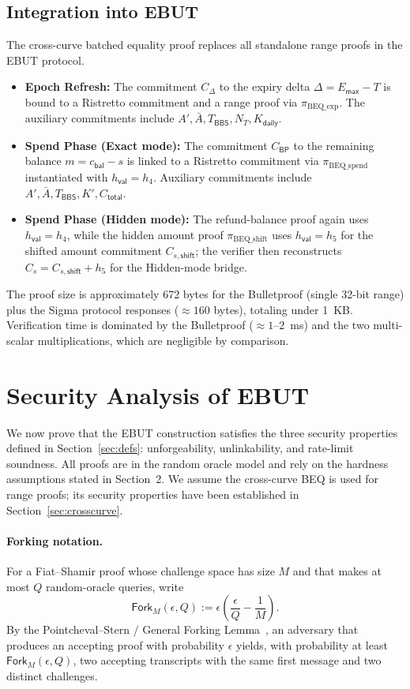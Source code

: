 \documentclass[11pt]{article}
\theoremstyle{definitionstyle}
\theoremstyle{plain}
\begin{document}
\subsection{Integration into EBUT}
The cross-curve batched equality proof replaces all standalone range proofs in the EBUT protocol.
\begin{itemize}
\item \textbf{Epoch Refresh:} The commitment $C_{\Delta}$ to the expiry delta $\Delta = E_{\mathsf{max}} - T$ is bound to a Ristretto commitment and a range proof via $\pi_{\text{BEQ\_exp}}$. The auxiliary commitments include $A', \bar{A}, T_{\mathsf{BBS}}, N_T, K_{\mathsf{daily}}$.
\item \textbf{Spend Phase (Exact mode):} The commitment $C_{\mathsf{BP}}$ to the remaining balance $m = c_{\mathsf{bal}} - s$ is linked to a Ristretto commitment via $\pi_{\text{BEQ\_spend}}$ instantiated with $h_{\mathsf{val}} = h_4$. Auxiliary commitments include $A', \bar{A}, T_{\mathsf{BBS}}, K', C_{\mathsf{total}}$.
\item \textbf{Spend Phase (Hidden mode):} The refund-balance proof again uses $h_{\mathsf{val}} = h_4$, while the hidden amount proof $\pi_{\text{BEQ\_shift}}$ uses $h_{\mathsf{val}} = h_5$ for the shifted amount commitment $C_{s,\mathsf{shift}}$; the verifier then reconstructs $C_s = C_{s,\mathsf{shift}} + h_5$ for the Hidden-mode bridge.
\end{itemize}
The proof size is approximately 672 bytes for the Bulletproof (single 32-bit range) plus the Sigma protocol responses ($\approx 160$ bytes), totaling under 1~KB. Verification time is dominated by the Bulletproof ($\approx 1$--$2$~ms) and the two multi-scalar multiplications, which are negligible by comparison.

\section{Security Analysis of EBUT}
\label{sec:security-ebut}

We now prove that the EBUT construction satisfies the three security properties defined in Section~\ref{sec:defs}: unforgeability, unlinkability, and rate-limit soundness. All proofs are in the random oracle model and rely on the hardness assumptions stated in Section~2. We assume the cross-curve BEQ is used for range proofs; its security properties have been established in Section~\ref{sec:crosscurve}.

\paragraph{Forking notation.}
For a Fiat--Shamir proof whose challenge space has size $M$ and that makes at most $Q$ random-oracle queries, write
\[
\mathsf{Fork}_M(\epsilon,Q) := \epsilon\!\left(\frac{\epsilon}{Q}-\frac{1}{M}\right).
\]
By the Pointcheval--Stern / General Forking Lemma~\cite{PointchevalStern00,BellareNeven06}, an adversary that produces an accepting proof with probability $\epsilon$ yields, with probability at least $\mathsf{Fork}_M(\epsilon,Q)$, two accepting transcripts with the same first message and two distinct challenges.
\end{document}
